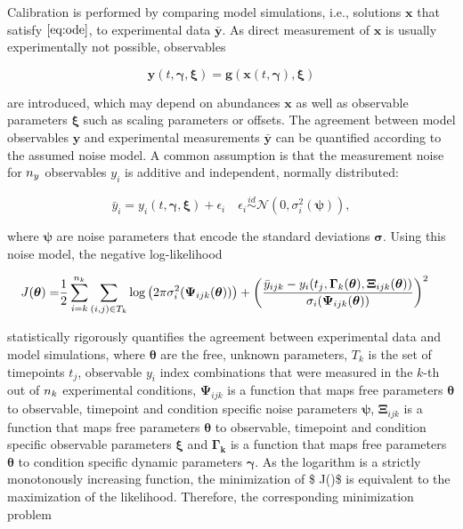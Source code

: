 \documentclass[11pt]{article}
\begin{document}
Calibration is performed by comparing model simulations, i.e., solutions
\(\textbf{x}\) that satisfy \(\eqref{eq:ode}\), to experimental data
\(\bar{\textbf{y}}\). As direct measurement of \(\textbf{x}\) is usually
experimentally not possible, observables

\begin{equation}
\textbf{y}(t,\boldsymbol{\gamma},\boldsymbol{\xi}) = \textbf{g}(\textbf{x}(t,\boldsymbol{\gamma}),\boldsymbol{\xi})
\label{eq:observable}
\end{equation}

are introduced, which may depend on abundances \(\textbf{x}\) as well as
observable parameters \(\boldsymbol{\xi}\) such as scaling parameters or
offsets. The agreement between model observables \(\textbf{y}\) and
experimental measurements \(\bar{\textbf{y}}\) can be quantified
according to the assumed noise model. A common assumption is that the
measurement noise for \({n_{y}}\) observables \(y_i\) is additive and
independent, normally distributed:

\begin{equation}
\bar{y}_{i} = y_i(t,\boldsymbol{\gamma},\boldsymbol{\xi}) + \epsilon_{i} \quad \epsilon_{i} \overset{id}{\sim} \mathcal{N}(0,\sigma_{i}^2(\boldsymbol{\psi})),
\label{eq:noise}
\end{equation}

where \(\boldsymbol{\psi}\) are noise parameters that encode the
standard deviations \(\boldsymbol{\sigma}\). Using this noise model, the
negative log-likelihood

\begin{equation}
\begin{aligned}
J(\boldsymbol{\theta}) =&  \frac{1}{2} \sum_{i=k}^{n_{k}} \sum_{(i,j) \in T_k} \log\left(2\pi\sigma_{i}^2(\boldsymbol{\Psi}_{ijk}(\boldsymbol{\theta}))\right) + \left(\frac{\bar{y}_{ijk} - y_{i}(t_j,\boldsymbol{\Gamma}_k(\boldsymbol{\theta}),\boldsymbol{\Xi}_{ijk}(\boldsymbol{\theta}))}{\sigma_{i}(\boldsymbol{\Psi}_{ijk}(\boldsymbol{\theta}))}\right)^2
\label{eq:objective}
\end{aligned}
\end{equation}

statistically rigorously quantifies the agreement between experimental
data and model simulations, where \(\boldsymbol{\theta}\) are the free,
unknown parameters, \(T_k\) is the set of timepoints \(t_j\), observable
\(y_i\) index combinations that were measured in the \(k\)-th out of
\({n_{k}}\) experimental conditions, \(\boldsymbol{\Psi}_{ijk}\) is a
function that maps free parameters \(\boldsymbol{\theta}\) to
observable, timepoint and condition specific noise parameters
\(\boldsymbol{\psi}\), \(\boldsymbol{\Xi}_{ijk}\) is a function that
maps free parameters \(\boldsymbol{\theta}\) to observable, timepoint
and condition specific observable parameters \(\boldsymbol{\xi}\) and
\(\boldsymbol{\Gamma_{k}}\) is a function that maps free parameters
\(\boldsymbol{\theta}\) to condition specific dynamic parameters
\(\boldsymbol{\gamma}\). As the logarithm is a strictly monotonously
increasing function, the minimization of \$ J(\boldsymbol{\theta})\$ is
equivalent to the maximization of the likelihood. Therefore, the
corresponding minimization problem
\end{document}
